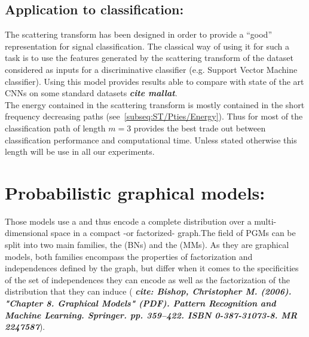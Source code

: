 \documentclass[a4paper,11pt]{report}
\begin{document}
{		
  \section{Application to classification:}
    \label{seq:ST/Applications to clf}
    
    The scattering transform has been designed in order to provide a ``good'' representation for signal classification. The classical way of using it for such a task is to use the features generated by the scattering transform of the dataset considered as inputs for a discriminative classifier (e.g. Support Vector Machine classifier). Using this model provides results able to compare with state of the art CNNs on some standard datasets \textbf{\textit{cite mallat}}. \\
    
    The energy contained in the scattering transform is mostly contained in the short frequency decreasing paths (see~\ref{subseq:ST/Pties/Energy}). Thus for most of the classification path of length $m=3$ provides the best trade out between classification performance and computational time. Unless stated otherwise this length will be use in all our experiments.
    
    
\chapter{Probabilistic graphical models:}
  \label{chap:PGMs}
  
  Those models use a  and thus encode a complete distribution over a multi-dimensional space in a compact -or factorized- graph.The field of PGMs can be split into two main families, the  (BNs) and the  (MMs). As they are graphical models, both families encompass the properties of factorization and independences defined by the graph, but differ when it comes to the specificities of the set of independences they can encode as well as the factorization of the distribution that they can induce (  \textbf{\textit{cite: Bishop, Christopher M. (2006). "Chapter 8. Graphical Models" (PDF). Pattern Recognition and Machine Learning. Springer. pp. 359–422. ISBN 0-387-31073-8. MR 2247587}}).\\
  
}
\end{document}
